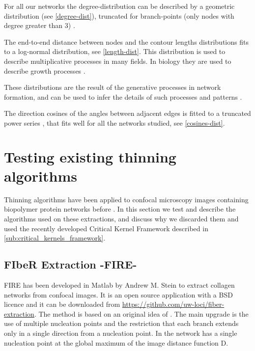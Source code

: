 For all our networks the degree-distribution can be described by a geometric distribution (see \autoref{degree-dist}), truncated for branch-points (only nodes with degree greater than 3) .

The end-to-end distance between nodes and the contour lengths distributions fits to a
log-normal distribution, see \autoref{length-dist}. This distribution is used to describe multiplicative processes in many fields.
In biology they are used to describe growth processes \cite{mitzenmacher_brief_2004}.

These distributions are the result of the generative processes in network formation, and can be used to infer the details of such processes and patterns \cite{frank_common_2009, frank_how_2014}.

The direction cosines of the angles between adjacent edges is fitted to a truncated power series \cite{lindstrom_finite-strain_2013}, that fits well for all the networks studied, see \autoref{cosines-dist}.


\section{Testing existing thinning algorithms}%
\label{sec:testing_other_thinning_algorithms}

Thinning algorithms have been applied to confocal microscopy images containing biopolymer protein networks before \cite{stein_algorithm_2008, lindstrom_biopolymer_2010}.
In this section we test and describe the algorithms used on these extractions, and discuss why we discarded them and used the recently developed Critical Kernel Framework \cite{bertrand_powerful_2014} described in \autoref{sub:critical_kernels_framework}.

\subsection{FIbeR Extraction -FIRE-}
\label{sub:FIRE}

FIRE has been developed in Matlab by Andrew M. Stein
  \citep{stein_mathematical_2007} to extract collagen networks from confocal
  images. It is an open source application with a BSD licence and it can be downloaded from
  \url{https://github.com/uw-loci/fiber-extraction}. The method
  \citep{stein_algorithm_2008} is based on an original idea of
  \citet{wu_automated_2003}. The main upgrade is the use of multiple nucleation
  points  and the restriction that each branch extends only  in a single
  direction from a nucleation point. In \citet{wu_automated_2003} the network has a single nucleation point at the global maximum of the image distance function D.

